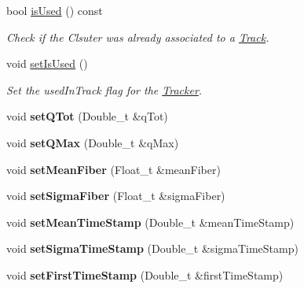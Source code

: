 \begin{DoxyCompactItemize}
bool \hyperlink{classCluster_a3fb10af0d537659bc85844087dbdb5d2}{is\+Used} () const
\begin{DoxyCompactList}\small\item\em Check if the Clsuter was already associated to a \hyperlink{classTrack}{Track}. \end{DoxyCompactList}\item 
\mbox{\label{classCluster_a5d893796dabaaf60c0ae1ad59df90f29}} 
void \hyperlink{classCluster_a5d893796dabaaf60c0ae1ad59df90f29}{set\+Is\+Used} ()
\begin{DoxyCompactList}\small\item\em Set the used\+In\+Track flag for the \hyperlink{classTracker}{Tracker}. \end{DoxyCompactList}\item 
\mbox{\label{classCluster_a2cb9837dc7527521adbbfd004e5ab638}} 
void {\bfseries set\+Q\+Tot} (Double\+\_\+t \&q\+Tot)
\item 
\mbox{\label{classCluster_acba72d0c451b429ac1ae8f0fef46ac83}} 
void {\bfseries set\+Q\+Max} (Double\+\_\+t \&q\+Max)
\item 
\mbox{\label{classCluster_a181d1faa8d3d0bda8424bebe868d13ac}} 
void {\bfseries set\+Mean\+Fiber} (Float\+\_\+t \&mean\+Fiber)
\item 
\mbox{\label{classCluster_a8233157f8c83330a859fd0af284d36ad}} 
void {\bfseries set\+Sigma\+Fiber} (Float\+\_\+t \&sigma\+Fiber)
\item 
\mbox{\label{classCluster_acfa5cb90b8f6454dc757842c1e5921dc}} 
void {\bfseries set\+Mean\+Time\+Stamp} (Double\+\_\+t \&mean\+Time\+Stamp)
\item 
\mbox{\label{classCluster_a7fa652aa68dec8e0148ce7f27ab79572}} 
void {\bfseries set\+Sigma\+Time\+Stamp} (Double\+\_\+t \&sigma\+Time\+Stamp)
\item 
\mbox{\label{classCluster_aa5aad7f1fa30683814e404dead7eb59b}} 
void {\bfseries set\+First\+Time\+Stamp} (Double\+\_\+t \&first\+Time\+Stamp)
\item 
\mbox{\label{classCluster_ad4f4eb5d2636ca90754d77e1aebd1e61}} 

\end{DoxyCompactItemize}

